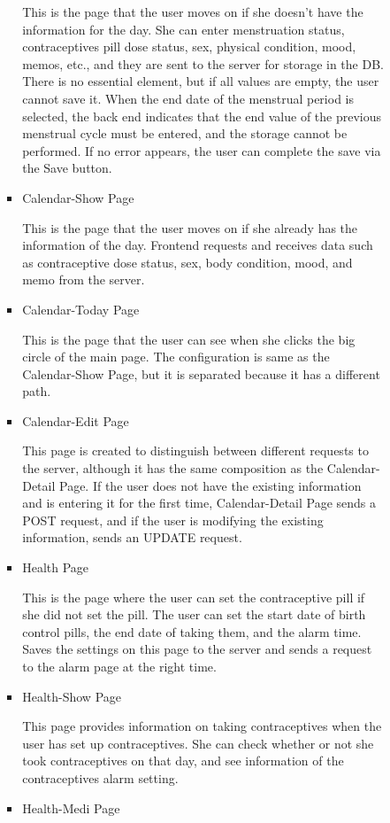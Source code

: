 \documentclass[conference]{IEEEtran}
\begin{document}
\begin{itemize}
\begin{enumerate}
\begin{enumerate}
\begin{itemize}
               \setlength{\parindent}{2ex} This is the page that the user moves on if she doesn't have the information for the day. She can enter menstruation status, contraceptives pill dose status, sex, physical condition, mood, memos, etc., and they are sent to the server for storage in the DB. There is no essential element, but if all values are empty, the user cannot save it. When the end date of the menstrual period is selected, the back end indicates that the end value of the previous menstrual cycle must be entered, and the storage cannot be performed. If no error appears, the user can complete the save via the Save button.
                \item Calendar-Show Page
            
                \setlength{\parindent}{2ex} This is the page that the user moves on if she already has the information of the day. Frontend requests and receives data such as contraceptive dose status, sex, body condition, mood, and memo from the server.
                \item Calendar-Today Page
            
               \setlength{\parindent}{2ex} This is the page that the user can see when she clicks the big circle of the main page. The configuration is same as the Calendar-Show Page, but it is separated because it has a different path.
                \item Calendar-Edit Page
            
               \setlength{\parindent}{2ex} This page is created to distinguish between different requests to the server, although it has the same composition as the Calendar-Detail Page. If the user does not have the existing information and is entering it for the first time, Calendar-Detail Page sends a POST request, and if the user is modifying the existing information, sends an UPDATE request.
                \item Health Page
            
               \setlength{\parindent}{2ex} This is the page where the user can set the contraceptive pill if she did not set the pill. The user can set the start date of birth control pills, the end date of taking them, and the alarm time. Saves the settings on this page to the server and sends a request to the alarm page at the right time.
                \item Health-Show Page
            
                \setlength{\parindent}{2ex} This page provides information on taking contraceptives when the user has set up contraceptives. She can check whether or not she took contraceptives on that day, and see information of the contraceptives alarm setting.
                \item Health-Medi Page
            

\end{itemize}
\end{enumerate}
\end{enumerate}
\end{itemize}
\end{document}
